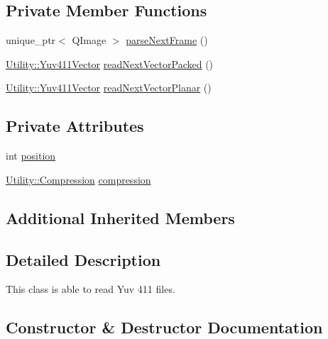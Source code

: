 \subsection*{Private Member Functions}
\begin{DoxyCompactItemize}
\item 
unique\+\_\+ptr$<$ Q\+Image $>$ \hyperlink{classUtility_1_1Yuv411FileReader_a22ed1cd234a6f19e4108129f99faa4ad}{parse\+Next\+Frame} ()
\item 
\hyperlink{classUtility_1_1Yuv411Vector}{Utility\+::\+Yuv411\+Vector} \hyperlink{classUtility_1_1Yuv411FileReader_a5839a300485e76fa27cd9cf17f157bd3}{read\+Next\+Vector\+Packed} ()
\item 
\hyperlink{classUtility_1_1Yuv411Vector}{Utility\+::\+Yuv411\+Vector} \hyperlink{classUtility_1_1Yuv411FileReader_ae4778b06d609c73ddb55f1b8fc73252c}{read\+Next\+Vector\+Planar} ()
\end{DoxyCompactItemize}
\subsection*{Private Attributes}
\begin{DoxyCompactItemize}
\item 
int \hyperlink{classUtility_1_1Yuv411FileReader_a401e942526aac47cef94f478182486e7}{position}
\item 
\hyperlink{namespaceUtility_a56a83bf6847f4801f4205eb4be237ccf}{Utility\+::\+Compression} \hyperlink{classUtility_1_1Yuv411FileReader_aa484ffcb0c9f4d4dea91c6fae73f1fda}{compression}
\end{DoxyCompactItemize}
\subsection*{Additional Inherited Members}


\subsection{Detailed Description}
This class is able to read Yuv 411 files. 

\subsection{Constructor \& Destructor Documentation}
\hypertarget{classUtility_1_1Yuv411FileReader_af4e7eb4bd4929f14e6334ae7ac9dad6f}{}
